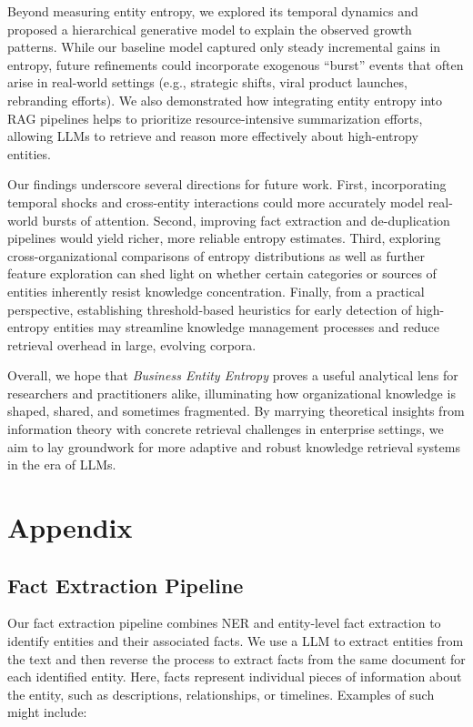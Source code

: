 \documentclass[11pt,a4paper]{article}
\begin{document}
Beyond measuring entity entropy, we explored its temporal dynamics and proposed a hierarchical generative model to explain the observed growth patterns. While our baseline model captured only steady incremental gains in entropy, future refinements could incorporate exogenous ``burst'' events that often arise in real-world settings (e.g., strategic shifts, viral product launches, rebranding efforts). We also demonstrated how integrating entity entropy into RAG pipelines helps to prioritize resource-intensive summarization efforts, allowing LLMs to retrieve and reason more effectively about high-entropy entities.

Our findings underscore several directions for future work. First, incorporating temporal shocks and cross-entity interactions could more accurately model real-world bursts of attention. Second, improving fact extraction and de-duplication pipelines would yield richer, more reliable entropy estimates. Third, exploring cross-organizational comparisons of entropy distributions as well as further feature exploration can shed light on whether certain categories or sources  of entities inherently resist knowledge concentration. Finally, from a practical perspective, establishing threshold-based heuristics for early detection of high-entropy entities may streamline knowledge management processes and reduce retrieval overhead in large, evolving corpora.

Overall, we hope that \emph{Business Entity Entropy} proves a useful analytical lens for researchers and practitioners alike, illuminating how organizational knowledge is shaped, shared, and sometimes fragmented. By marrying theoretical insights from information theory with concrete retrieval challenges in enterprise settings, we aim to lay groundwork for more adaptive and robust knowledge retrieval systems in the era of LLMs.

\pagebreak
\FloatBarrier
\section{Appendix} \label{sec:appendix}
\subsection{Fact Extraction Pipeline}
\label{appendix:fact_extraction_pipeline}

Our fact extraction pipeline combines NER and entity-level fact extraction to identify entities and their associated facts. We use a LLM to extract entities from the text and then reverse the process to extract facts from the same document for each identified entity. Here, facts represent individual pieces of information about the entity, such as descriptions, relationships, or timelines. Examples of such might include:
\end{document}
